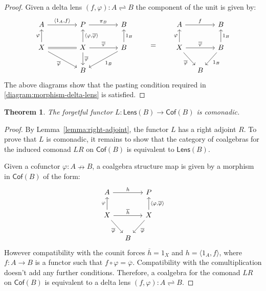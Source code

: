 \documentclass[colorlinks = true, a4paper, oneside, reqno, 11pt]{amsart}
\newtheorem{theorem}{Theorem}
\theoremstyle{definition}
\theoremstyle{remark}
\newcommand{\Cof}{\mathsf{Cof}}
\newcommand{\Lens}{\mathsf{Lens}}
\newcommand{\phibar}{\overline{\varphi}}
\begin{document}
\begin{proof}
Given a delta lens $(f, \varphi) \colon A \rightleftharpoons B$ the component of
the unit is given by: 
\begin{equation}
\label{eqn:unit}
\begin{tikzcd}[column sep = 2em]
A 
\arrow[rr, "{\langle 1_{A}, f \rangle}"]
& & P
\arrow[rr, "\pi_{B}"]
& & B
\\
X
\arrow[u, "\varphi"]
\arrow[rr, equal]
\arrow[rrd, "\phibar"']
& & X 
\arrow[u, "{\langle \varphi, \phibar \rangle}"']
\arrow[d, "\phibar"]
\arrow[rr, "\phibar"]
& & B
\arrow[u, "1_{B}"']
\arrow[lld, "1_{B}"]
\\
& & B & & 
\end{tikzcd}
%
\qquad = \qquad
% 
\begin{tikzcd}[column sep = small]
A 
\arrow[rr, "f"]
& & B
\\
X
\arrow[u, "\varphi"]
\arrow[rr, "\phibar"]
\arrow[rd, "\phibar"'] 
& & B 
\arrow[u, "1_{B}"']
\arrow[ld, "1_{B}"]
\\
& B &
\end{tikzcd}
\end{equation}
The above diagrams show that the pasting condition required in 
\eqref{diagram:morphism-delta-lens} is satisfied. 
\end{proof}

\begin{theorem}\label{thm:main}
The forgetful functor $L \colon \Lens(B) \rightarrow \Cof(B)$ is comonadic. 
\end{theorem}
\begin{proof}
By Lemma~\ref{lemma:right-adjoint}, the functor $L$ has a right adjoint $R$. 
To prove that $L$ is comonadic, it remains to show that the category of coalgebras
for the induced comonad $LR$ on $\Cof(B)$ is equivalent to $\Lens(B)$.

Given a cofunctor $\varphi \colon A \nrightarrow B$, a coalgebra structure map is given
by a morphism in $\Cof(B)$ of the form: 
\begin{equation}\label{eqn:coalgebra}
\begin{tikzcd}[column sep = small]
A 
\arrow[rr, "h"]
& & P
\\
X
\arrow[u, "\varphi"]
\arrow[rr, "\overline{h}"]
\arrow[rd, "\phibar"']
& & X 
\arrow[u, "{\langle \varphi, \phibar \rangle}"']
\arrow[ld, "\phibar"]
\\
& B &
\end{tikzcd}
\end{equation}
However compatibility with the counit forces $\overline{h} = 1_{X}$  
and $h = \langle 1_{A}, f \rangle$, where $f \colon A \rightarrow B$ is a functor 
such that $f \circ \varphi = \phibar$. 
Compatibility with the comultiplication doesn't add any further conditions. 
Therefore, a coalgebra for the comonad $LR$ on $\Cof(B)$ is equivalent to a delta lens
$(f, \varphi) \colon A \rightleftharpoons B$.  
\end{proof}
\end{document}
